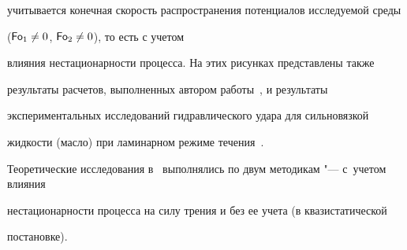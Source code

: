 учитывается конечная скорость распространения потенциалов исследуемой среды

($\operatorname{\sf Fo}_ 1 \ne 0$, $\operatorname{\sf Fo}_2 \ne 0$), то есть с учетом

влияния нестационарности процесса. На этих рисунках представлены также

результаты расчетов, выполненных автором работы~\cite{kud:bib15}, и результаты

экспериментальных исследований гидравлического удара для сильновязкой

жидкости (масло) при ламинарном режиме течения~\cite{kud:bib16}. 

Теоретические исследования в~\cite{kud:bib15} выполнялись по двум методикам "--- с~учетом влияния

нестационарности процесса на силу трения и без ее учета (в квазистатической

постановке).





